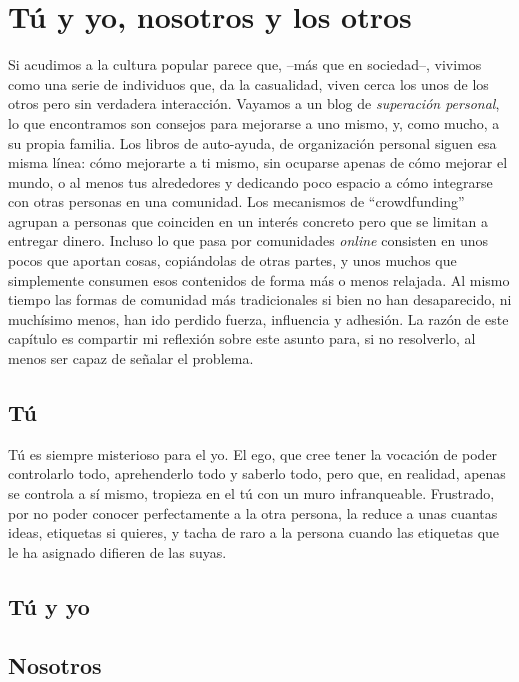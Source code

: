 \chapter{Tú y yo, nosotros y los otros}


Si acudimos a la cultura popular parece que, --más que en sociedad--, vivimos como una serie de individuos que, da la casualidad, viven cerca los unos de los otros pero sin verdadera interacción. Vayamos a un blog de \emph{superación personal}, lo que encontramos son consejos para mejorarse a uno mismo, y, como mucho, a su propia familia. Los libros de auto-ayuda, de organización personal siguen esa misma línea: cómo mejorarte a ti mismo, sin ocuparse apenas de cómo mejorar el mundo, o al menos tus alrededores y dedicando poco espacio a cómo integrarse con otras personas en una comunidad.  Los mecanismos de \enquote{crowdfunding} agrupan a personas que coinciden en un interés concreto pero que se limitan a entregar dinero. Incluso lo que pasa por comunidades \emph{online} consisten en unos pocos que aportan cosas, copiándolas de otras partes, y unos muchos que simplemente consumen esos contenidos de forma más o menos relajada. Al mismo tiempo las formas de comunidad más tradicionales si bien no han desaparecido, ni muchísimo menos, han ido perdido fuerza, influencia y adhesión. La razón de este capítulo es compartir mi reflexión sobre este asunto para, si no resolverlo, al menos ser capaz de señalar el problema.

\section{Tú}

Tú es siempre misterioso para el yo. El ego, que cree tener la vocación de poder controlarlo todo, aprehenderlo todo y saberlo todo, pero que, en realidad, apenas se controla a sí mismo, tropieza en el tú con un muro infranqueable. Frustrado, por no poder conocer perfectamente a la otra persona, la reduce a unas cuantas ideas, etiquetas si quieres, y tacha de raro a la persona cuando las etiquetas que le ha asignado difieren de las suyas.

\section{Tú y yo}

\section{Nosotros}

